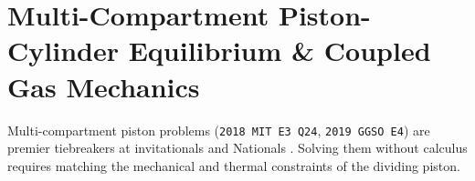 \section{Multi-Compartment Piston-Cylinder Equilibrium \& Coupled Gas Mechanics}\label{sec:06.7}

Multi-compartment piston problems (\texttt{2018 MIT E3 Q24}, \texttt{2019 GGSO E4}) are premier tiebreakers at invitationals and Nationals . Solving them without calculus requires matching the mechanical and thermal constraints of the dividing piston.

